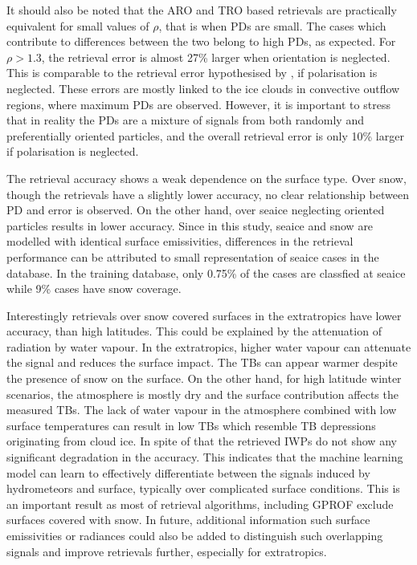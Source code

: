\documentclass[amt, manuscript]{copernicus}
\begin{document}
It should also be noted that the ARO and TRO based retrievals are practically equivalent for small values of $\rho$, that is when PDs are small. The cases which contribute to differences between the two belong to high PDs, as expected. For $\rho > 1.3$, the retrieval error is almost 27\% larger when orientation is neglected. This is comparable to the retrieval error hypothesised by \citet{gong:micro:17}, if polarisation is neglected. These errors are mostly linked to the ice clouds in convective outflow regions, where maximum PDs are observed. However, it is important to stress  that in reality the PDs are a mixture of signals from both randomly and preferentially oriented particles, and the overall retrieval error is only 10\% larger if polarisation is neglected. 

The retrieval accuracy shows a weak dependence on the surface type. Over snow, though the retrievals have a slightly lower accuracy, no clear relationship between PD and error is observed. On the other hand, over seaice neglecting oriented particles results in lower accuracy. Since in this study, seaice and snow are modelled with identical surface emissivities, differences in the retrieval performance can be attributed to small representation of seaice cases in the database. In the training database, only 0.75\% of the cases are classfied at seaice while 9\% cases have snow coverage.

Interestingly retrievals over snow covered surfaces in the extratropics have lower accuracy, than high latitudes. This could be explained by the attenuation of radiation by water vapour. In the extratropics, higher water vapour can attenuate the signal and reduces the surface impact. The TBs can appear warmer despite the presence of snow on the surface.  On the other hand, for high latitude winter scenarios, the atmosphere is mostly dry and the surface contribution affects the measured TBs. The lack of water vapour in the atmosphere combined with low surface temperatures can result in low TBs which resemble TB depressions originating from cloud ice. In spite of that the retrieved IWPs do not show any significant degradation in the accuracy. This indicates that the machine learning model can learn to effectively differentiate between the signals induced by hydrometeors and surface, typically over complicated surface conditions. This is an important result as most of retrieval algorithms, including GPROF exclude surfaces covered with snow. In future, additional information such  surface emissivities or radiances could also be added to distinguish such overlapping signals and improve retrievals further, especially for extratropics.  
\end{document}
